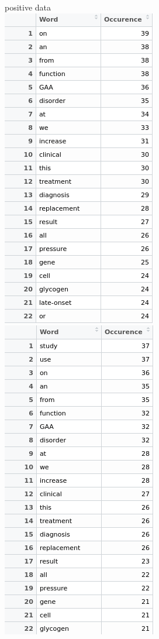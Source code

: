 \documentclass{article}
\begin{document}
  positive data\\
    \includegraphics[width=0.6\linewidth]{Rem_stop_words_neg.png}
    \includegraphics[width=0.6\linewidth]{Rem_stop_words_uni_neg.png}\\
\end{document}
